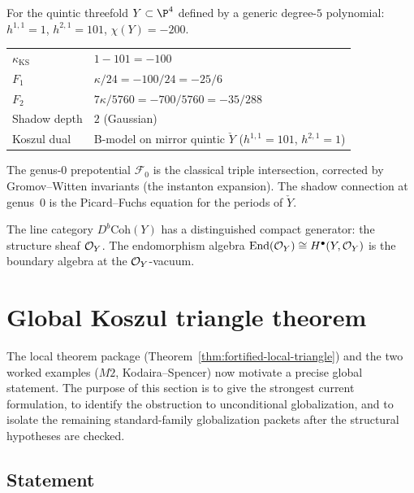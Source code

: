 \begin{computation}
For the quintic threefold $Y\subset\P^4$ defined by a
generic degree-$5$ polynomial:
$h^{1,1}=1$, $h^{2,1}=101$, $\chi(Y)=-200$.
\begin{center}
\renewcommand{\arraystretch}{1.2}
\begin{tabular}{ll}
$\kappa_{\mathrm{KS}}$ & $1-101=-100$ \\
$F_1$ & $\kappa/24=-100/24=-25/6$ \\
$F_2$ & $7\kappa/5760=-700/5760=-35/288$ \\
Shadow depth & $2$ (Gaussian) \\
Koszul dual & B-model on mirror quintic $\check{Y}$
($h^{1,1}=101$, $h^{2,1}=1$)
\end{tabular}
\end{center}
The genus-$0$ prepotential $\mathcal{F}_0$ is the classical
triple intersection, corrected by Gromov--Witten invariants
(the instanton expansion). The shadow connection at genus~$0$
is the Picard--Fuchs equation for the periods of $\check{Y}$.

The line category $D^b\mathrm{Coh}(Y)$ has a distinguished
compact generator: the structure sheaf $\mathcal O_Y$. The
endomorphism algebra $\operatorname{End}(\mathcal O_Y)\cong H^\bullet(Y,\mathcal O_Y)$
is the boundary algebra at the $\mathcal O_Y$-vacuum.
\end{computation}



\section{Global Koszul triangle theorem}

The local theorem package (Theorem~\ref{thm:fortified-local-triangle})
and the two worked examples ($M2$, Kodaira--Spencer) now motivate
a precise global statement. The purpose of this section is to
give the strongest current formulation, to identify the
obstruction to unconditional globalization, and to isolate the
remaining standard-family globalization packets after the
structural hypotheses are checked.

\subsection{Statement}

